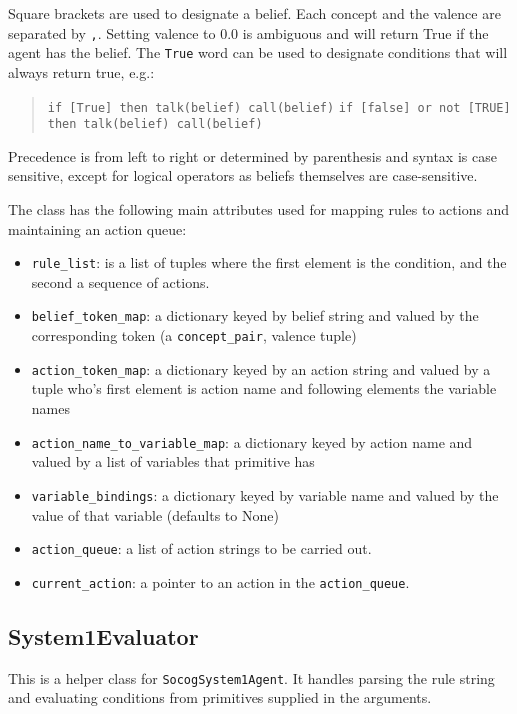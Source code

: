 \documentclass[11pt, a4paper]{article}
\begin{document}
Square brackets are used to designate a belief. Each concept and the valence are separated by \texttt{,}. Setting valence to 0.0 is ambiguous and will return True if the agent has the belief. The \texttt{True} word can be used to designate conditions that will always return true, e.g.:

\begin{quote}
\texttt{if [True] then talk(belief) call(belief)}
\texttt{if [false] or not [TRUE] then talk(belief) call(belief)}
\end{quote}

Precedence is from left to right or determined by parenthesis and syntax is case sensitive, except for logical operators as beliefs themselves are case-sensitive.

The class has the following main attributes used for mapping rules to actions and maintaining an action queue:

\begin{itemize}
    \item \texttt{rule\_list}: is a list of tuples where the first element is the condition, and the second a sequence of actions.
    \item \texttt{belief\_token\_map}: a dictionary keyed by belief string and valued by the corresponding token (a \texttt{concept\_pair}, valence tuple)
    \item \texttt{action\_token\_map}: a dictionary keyed by an action string and valued by a tuple who's first element is action name and following elements the variable names
    \item \texttt{action\_name\_to\_variable\_map}: a dictionary keyed by action name and valued by a list of variables that primitive has
    \item \texttt{variable\_bindings}: a dictionary keyed by variable name and valued by the value of that variable (defaults to None)
    \item \texttt{action\_queue}: a list of action strings to be carried out.
    \item \texttt{current\_action}: a pointer to an action in the \texttt{action\_queue}.
\end{itemize}

\subsection{System1Evaluator}

This is a helper class for \texttt{SocogSystem1Agent}. It handles parsing the rule string and evaluating conditions from primitives supplied in the arguments.
\end{document}
